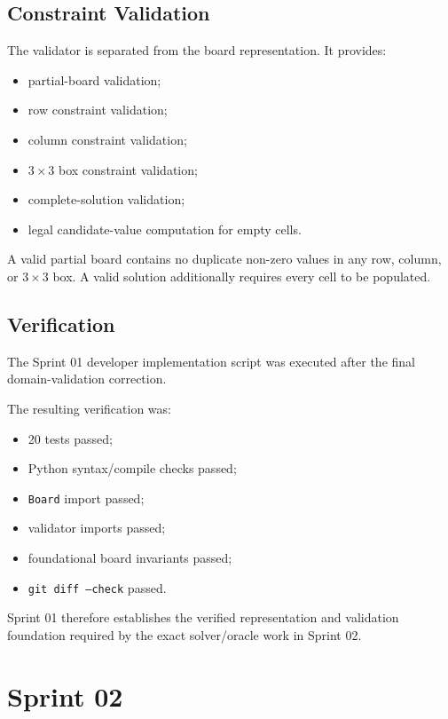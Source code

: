 \documentclass[11pt,a4paper]{article}
\begin{document}
\subsection{Constraint Validation}

The validator is separated from the board representation. It provides:

\begin{itemize}
    \item partial-board validation;
    \item row constraint validation;
    \item column constraint validation;
    \item $3\times3$ box constraint validation;
    \item complete-solution validation;
    \item legal candidate-value computation for empty cells.
\end{itemize}

A valid partial board contains no duplicate non-zero values in any row,
column, or $3\times3$ box. A valid solution additionally requires every cell
to be populated.

\subsection{Verification}

The Sprint 01 developer implementation script was executed after the final
domain-validation correction.

The resulting verification was:

\begin{itemize}
    \item 20 tests passed;
    \item Python syntax/compile checks passed;
    \item \texttt{Board} import passed;
    \item validator imports passed;
    \item foundational board invariants passed;
    \item \texttt{git diff --check} passed.
\end{itemize}

Sprint 01 therefore establishes the verified representation and validation
foundation required by the exact solver/oracle work in Sprint 02.

\section{Sprint 02}
\end{document}
